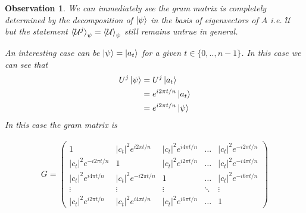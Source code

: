 \documentclass[12pt,letterpaper]{article}
\newtheorem{observation}{Observation}
\begin{document}
\begin{multicols}{2}
\begin{observation}
We can immediately see the gram matrix is completely determined by the decomposition of $\ket{\psi}$ in the basis of eigenvectors of $A$ i.e. $\mathcal{U}$ but the statement $\braket{\mathcal{U}^{j}}_{\psi} =\braket{\mathcal{U}}_{\psi}$ still remains untrue in general. \par 
An interesting case can be $\ket{\psi}=\ket{a_t}$ for a given $t\in\{0,..,n-1\}$. In this case we can see that 
\begin{align}
U^j\ket{\psi}&=U^j\ket{a_t}\\&=e^{i2\pi t/n}\ket{a_t}\\&=e^{i2\pi t/n}\ket{\psi}
\end{align}
In this case the gram matrix is
\end{observation}
\end{multicols}
\begin{align}\label{eqGramMatrixZn}
G=\begin{pmatrix}
 1 & |c_t|^2e^{i2\pi t/n} & |c_t|^2e^{i4\pi t/n} & \hdots &  |c_t|^2e^{-i2\pi t/n} \\
  |c_t|^2e^{-i2\pi t/n} & 1 & |c_t|^2e^{i2\pi t/n} & \hdots & |c_t|^2e^{-i4\pi t/n} \\
  |c_t|^2e^{i4\pi t/n} &  |c_t|^2e^{-i2\pi t/n}  & 1 & \hdots & |c_t|^2e^{-i6\pi t/n}  \\
   \vdots & \vdots & \vdots & \ddots & \vdots \\
  |c_t|^2e^{i2\pi t/n} &|c_t|^2e^{i4\pi t/n}  & |c_t|^2e^{i6\pi t/n}  & \hdots &  1 
\end{pmatrix}
\end{align}
\end{document}
